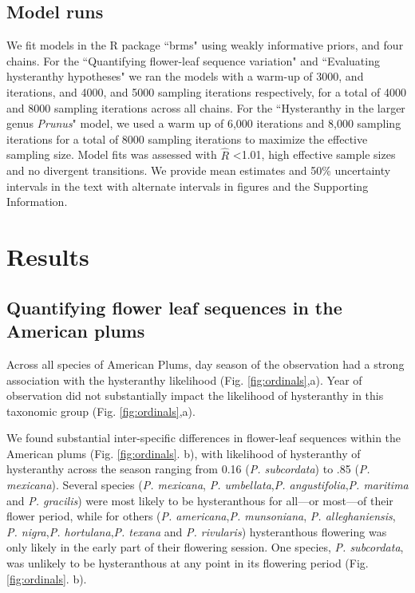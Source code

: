 \documentclass{article}[12pt]
\begin{document}
\subsection*{Model runs} 
 
We fit models in the R package ``brms" \citep{Burkner2018} using weakly informative priors, and four chains.
For the ``Quantifying flower-leaf sequence variation" and ``Evaluating hysteranthy hypotheses" we ran the models with a warm-up of 3000, and iterations, and 4000, and 5000 sampling iterations respectively, for a total of 4000 and 8000 sampling iterations across all chains. For the ``Hysteranthy in the larger genus \textit{Prunus}" model, we used a warm up of 6,000 iterations and 8,000 sampling iterations for a total of 8000 sampling iterations to maximize the effective sampling size. Model fits was assessed with  $\hat{R}$ <1.01, high effective sample sizes and no divergent transitions. We provide mean estimates and 50\% uncertainty intervals in the text with alternate intervals in figures and the Supporting Information. 

\section*{Results}
\subsection*{Quantifying flower leaf sequences in the American plums}
Across all species of American Plums, day season of the observation had a strong association with the hysteranthy likelihood (Fig. \ref{fig:ordinals},a). Year of observation did not substantially impact the likelihood of hysteranthy in this taxonomic group (Fig. \ref{fig:ordinals},a).

We found substantial inter-specific differences in flower-leaf sequences within the American plums (Fig. \ref{fig:ordinals}. b), with likelihood of hysteranthy of hysteranthy across the season ranging from 0.16 (\emph{P. subcordata}) to .85 (\emph{P. mexicana}). Several species (\emph{P. mexicana}, \textit{P. umbellata},\textit{P. angustifolia},\textit{P. maritima} and \textit{P. gracilis}) were most likely to be hysteranthous for all---or most---of their flower period, while for others (\textit{P. americana},\textit{P. munsoniana}, \textit{P. alleghaniensis}, \textit{P. nigra},\textit{P. hortulana},\textit{P. texana} and \textit{P. rivularis}) hysteranthous flowering was only likely in the early part of their flowering session. One species, \emph{P. subcordata}, was unlikely to be hysteranthous at any point in its flowering period (Fig. \ref{fig:ordinals}. b).
\end{document}

